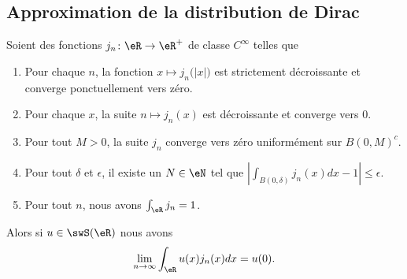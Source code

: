 \subsection{Approximation de la distribution de Dirac}


\begin{lemma}        \label{LEMooHEEOooFtKgfz}
    Soient des fonctions \( j_n\colon \eR\to \eR^+\) de classe \(  C^{\infty}\) telles que
    \begin{enumerate}
        \item
            Pour chaque \( n\), la fonction \( x\mapsto j_n\big( | x | \big)\) est strictement décroissante et converge ponctuellement vers zéro.
        \item
            Pour chaque \( x\), la suite \( n\mapsto j_n(x)\) est décroissante et converge vers \( 0\).
        \item       \label{ITEMooFQYXooEkUAIb}
            Pour tout \( M>0\), la suite \( j_n\) converge vers zéro uniformément sur \( B(0,M)^c\).
        \item       \label{ITEMooFYCRooFeRRjE}
            Pour tout \( \delta\) et \( \epsilon\), il existe un \( N\in \eN\) tel que \( | \int_{B(0,\delta)}j_n(x)dx-1 |\leq\epsilon\).
        \item
            Pour tout \( n\), nous avons \( \int_{\eR}j_n=1\).
    \end{enumerate}
    Alors si \( u\in\swS(\eR)\) nous avons
    \begin{equation}
        \lim_{n\to \infty} \int_{\eR}u(x)j_n(x)dx=u(0).
    \end{equation}
\end{lemma}

